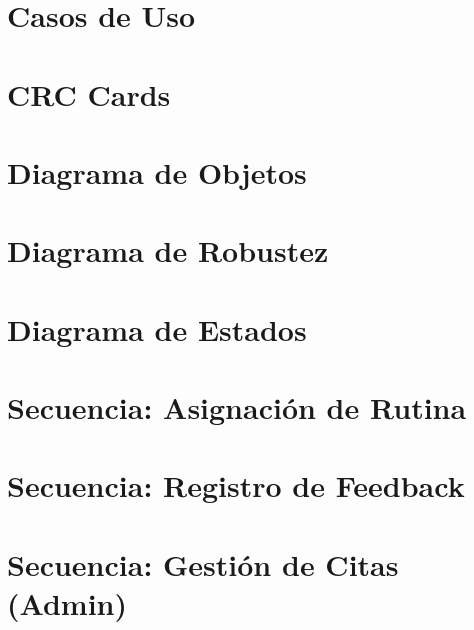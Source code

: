 \section{Casos de Uso}


\section{CRC Cards}


\section{Diagrama de Objetos}


\section{Diagrama de Robustez}


\section{Diagrama de Estados}


\section{Secuencia: Asignación de Rutina}


\section{Secuencia: Registro de Feedback}


\section{Secuencia: Gestión de Citas (Admin)}


